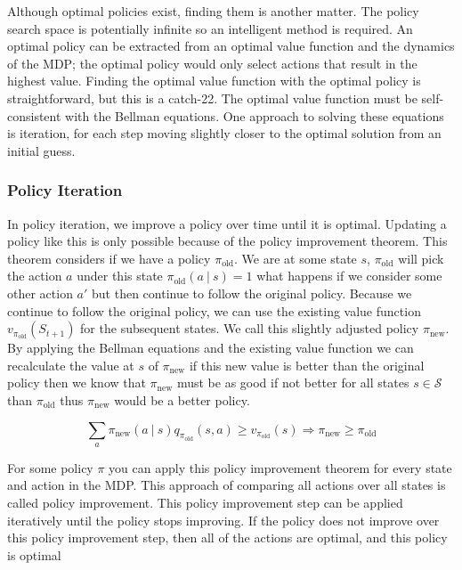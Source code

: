 \documentclass[]{final_report}
\begin{document}
Although optimal policies exist, finding them is another matter. The policy search space is potentially infinite so an intelligent method is required. An optimal policy can be extracted from an optimal value function and the dynamics of the MDP; the optimal policy would only select actions that result in the highest value. Finding the optimal value function with the optimal policy is straightforward, but this is a catch-22. The optimal value function must be self-consistent with the Bellman equations. One approach to solving these equations is iteration, for each step moving slightly closer to the optimal solution from an initial guess. 

\subsubsection{Policy Iteration}

In policy iteration, we improve a policy over time until it is optimal. Updating a policy like this is only possible because of the policy improvement theorem. This theorem considers if we have a policy $\pi_{\text{old}}$. We are at some state $s$, $\pi_{\text{old}}$ will pick the action $a$ under this state $\pi_{\text{old}}(a\ |\ s) = 1$ what happens if we consider some other action $a'$ but then continue to follow the original policy. Because we continue to follow the original policy, we can use the existing value function $v_{\pi_{\text{old}}}(S_{t+1})$ for the subsequent states. We call this slightly adjusted policy $\pi_{\text{new}}$. By applying the Bellman equations and the existing value function we can recalculate the value at $s$ of $\pi_{\text{new}}$ if this new value is better than the original policy then we know that $\pi_{\text{new}}$ must be as good if not better for all states $s \in \mathcal{S}$ than $\pi_{\text{old}}$ thus $\pi_{\text{new}}$ would be a better policy. 


\begin{equation}
  \sum_a \pi_{\text{new}}(a\ |\ s) q_{\pi_{\text{old}}}(s,a) \ge v_{\pi_{\text{old}}}(s) \Rightarrow  \pi_{\text{new}} \ge \pi_{\text{old}}
  \label{eqn:policy-improvement-theorem}
\end{equation}

For some policy $\pi$ you can apply this policy improvement theorem for every state and action in the MDP. This approach of comparing all actions over all states is called policy improvement. This policy improvement step can be applied iteratively until the policy stops improving. If the policy does not improve over this policy improvement step, then all of the actions are optimal, and this policy is optimal
\end{document}
